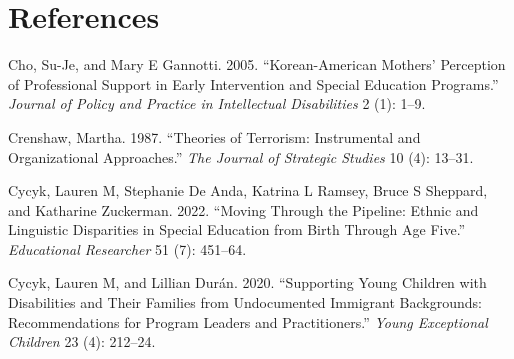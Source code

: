 \documentclass[
  letterpaper,
  DIV=11,
  numbers=noendperiod]{scrartcl}
\newlength{\cslhangindent}
\newenvironment{CSLReferences}[2] %
 {\begin{list}{}{%
  \setlength{\itemindent}{0pt}
  \setlength{\leftmargin}{0pt}
  \setlength{\parsep}{0pt}
  \ifodd #1
   \setlength{\leftmargin}{\cslhangindent}
   \setlength{\itemindent}{-1\cslhangindent}
  \fi
  \setlength{\itemsep}{#2\baselineskip}}}
 {\end{list}}
\begin{document}
\newpage

\section*{References}\label{references}

\label{refs}
\begin{CSLReferences}{1}{0}
Cho, Su-Je, and Mary E Gannotti. 2005. {``Korean-American Mothers'
Perception of Professional Support in Early Intervention and Special
Education Programs.''} \emph{Journal of Policy and Practice in
Intellectual Disabilities} 2 (1): 1--9.

Crenshaw, Martha. 1987. {``Theories of Terrorism: Instrumental and
Organizational Approaches.''} \emph{The Journal of Strategic Studies} 10
(4): 13--31.

Cycyk, Lauren M, Stephanie De Anda, Katrina L Ramsey, Bruce S Sheppard,
and Katharine Zuckerman. 2022. {``Moving Through the Pipeline: Ethnic
and Linguistic Disparities in Special Education from Birth Through Age
Five.''} \emph{Educational Researcher} 51 (7): 451--64.

Cycyk, Lauren M, and Lillian Durán. 2020. {``Supporting Young Children
with Disabilities and Their Families from Undocumented Immigrant
Backgrounds: Recommendations for Program Leaders and Practitioners.''}
\emph{Young Exceptional Children} 23 (4): 212--24.

\end{CSLReferences}
\end{document}
